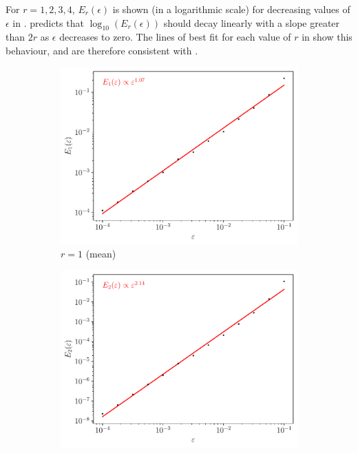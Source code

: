 For \(r = 1,2,3,4\), \(E_r\!\left(\epsilon\right)\) is shown (in a logarithmic scale) for decreasing values of \(\epsilon\) in .
 predicts that \(\log_{10}\left(E_r\!\left(\epsilon\right)\right)\) should decay linearly with a slope greater than \(2r\) as \(\epsilon\) decreases to zero.
The lines of best fit for each value of \(r\) in  show this behaviour, and are therefore consistent with .

\begin{figure}
	\begin{center}
		\begin{subfigure}{0.49\textwidth}
			\includegraphics[width=\textwidth]{chp04_paper_numerics/figures/rossby/str_err_r_1.0.pdf}
			\caption{\(r = 1\) (mean)}
			\label{fig:gamma_z_valid_1}
		\end{subfigure}
\begin{subfigure}{0.49\textwidth}
			\includegraphics[width=\textwidth]{chp04_paper_numerics/figures/rossby/str_err_r_2.0.pdf}

\end{subfigure}
\end{center}
\end{figure}
